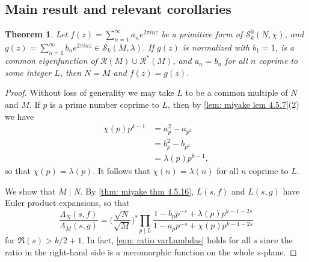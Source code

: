 \documentclass[10pt,leqno,twoside,b5paper]{article}
\theoremstyle{plain}
\newtheorem{theorem}[lem]{Theorem}
\theoremstyle{definition}
\numberwithin{equation}{section}
\numberwithin{lem}{section}
\begin{document}
\subsection{Main result and relevant corollaries}
\begin{theorem}\label{thm: sm1 miyake thm 4.6.19}
    Let $f(z) = \sum_{n=1}^\infty a_ne^{2\pi i nz}$ be a primitive form of $\mathcal S_k^0(N,\chi)$, and $g(z) = \sum_{n=1}^\infty b_ne^{2\pi i n z}\in \mathcal S_k(M,\lambda)$. If $g(z)$ is normalized with $b_1 = 1$, is a common eigenfunction of $\mathcal R(M)\cup \mathcal R^\ast(M)$, and $a_n = b_n$ for all $n$ coprime to some integer $L$, then $N = M$ and $f(z) = g(z)$.
\end{theorem}
\begin{proof}
    Without loss of generality we may take $L$ to be a common multiple of $N$ and $M$. If $p$ is a prime number coprime to $L$, then by \cref{lem: miyake lem 4.5.7}(2) we have
    \begin{align*}
        \chi(p)p^{k-1} &= a_p^2 - a_{p^2} \\
        &= b_p^2 - b_{p^2} \\
        &= \lambda(p)p^{k-1},
    \end{align*} so that $\chi(p) = \lambda(p)$. It follows that $\chi(n) = \lambda(n)$ for all $n$ coprime to $L$.

    We show that $M\mid N$. By \cref{thm: miyake thm 4.5.16}, $L(s,f)$ and $L(s,g)$ have Euler product expansions, so that
    \begin{equation}\label{eqn: ratio varLambdas}
        \frac{\varLambda_N(s,f)}{\varLambda_M(s,g)} = \bigg(\frac{\sqrt{N}}{\sqrt{M}}\bigg)^s\prod_{p\mid L}\frac{1-b_pp^{-s} + \lambda(p)p^{k-1-2s}}{1-a_pp^{-s} + \chi(p)p^{k-1-2s}}
    \end{equation} for $\Re(s)>k/2+1$. In fact, \cref{eqn: ratio varLambdas} holds for all $s$ since the ratio in the right-hand side is a meromorphic function on the whole $s$-plane.


\end{proof}
\end{document}
